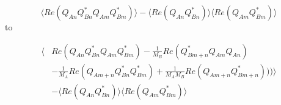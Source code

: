 \begin{equation}
	\langle {Re( Q_{An} Q_{Bn}^* Q_{Am} Q_{Bm}^*)} \rangle - \langle {Re( Q_{An}Q_{Bn}^*) } \rangle  \langle { Re(Q_{Am} Q_{Bm}^*) }\rangle 
\end{equation}
to

\begin{equation}
\begin{split}
	\langle &Re( Q_{An} Q_{Bn}^* Q_{Am} Q_{Bm}^*) - \frac{1}{M_B} Re(Q^*_{Bm+n}Q_{Am}Q_{An})\\
	 &-\frac{1}{M_A}Re(Q_{Am+n}Q^*_{Bn}Q^*_{Bm}) + \frac{1}{M_A M_B}Re(Q_{Am+n}Q^*_{Bm+n}) ) ) \rangle  \\
	 &- \langle {Re( Q_{An}Q_{Bn}^*) } \rangle  \langle { Re(Q_{Am} Q_{Bm}^*) }\rangle
\end{split}		
\end{equation}


